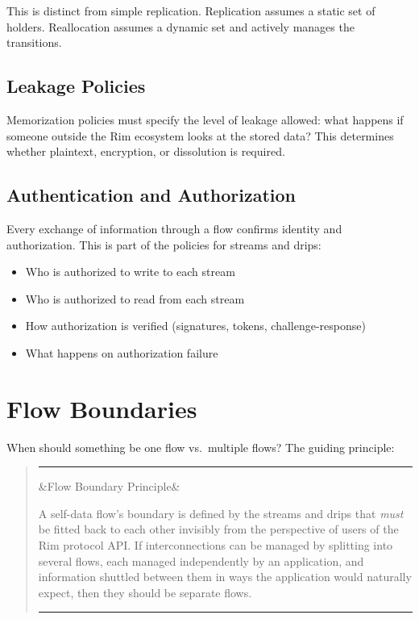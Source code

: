\documentclass[11pt, letterpaper]{article}
\newenvironment{definition}[1][]
  {\par\medskip\begin{quote}
   \color{rimdark}\rule{\dimexpr\linewidth}{1.5pt}\par\smallskip
   \ifx&#1&\else\noindent{\bfseries #1}\par\smallskip\fi}
  {\par\smallskip\color{rimdark}\rule{\dimexpr\linewidth}{1.5pt}
   \end{quote}\medskip}
\begin{document}
This is distinct from simple replication. Replication assumes a static set of holders.
Reallocation assumes a dynamic set and actively manages the transitions.

\subsection{Leakage Policies}

Memorization policies must specify the level of leakage allowed: what happens if
someone outside the Rim ecosystem looks at the stored data? This determines whether
plaintext, encryption, or dissolution is required.

\subsection{Authentication and Authorization}

Every exchange of information through a flow confirms identity and authorization.
This is part of the policies for streams and drips:

\begin{itemize}[leftmargin=2em]
  \item Who is authorized to write to each stream
  \item Who is authorized to read from each stream
  \item How authorization is verified (signatures, tokens, challenge-response)
  \item What happens on authorization failure
\end{itemize}


\newpage
\section{Flow Boundaries}
\label{sec:boundaries}

When should something be one flow vs.\ multiple flows? The guiding principle:

\begin{definition}[Flow Boundary Principle]
A self-data flow's boundary is defined by the streams and drips that \emph{must} be
fitted back to each other invisibly from the perspective of users of the Rim protocol
API. If interconnections can be managed by splitting into several flows, each managed
independently by an application, and information shuttled between them in ways the
application would naturally expect, then they should be separate flows.
\end{definition}
\end{document}

